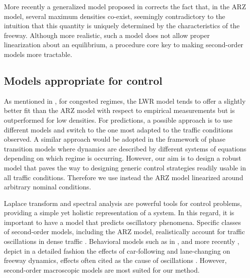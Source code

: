 \documentclass[preprint]{elsarticle}
\begin{document}

More recently a generalized model proposed in \cite{Fan} corrects the fact that, in the ARZ model, several maximum densities co-exist, seemingly contradictory to the intuition that this quantity is uniquely determined by the characteristics of the freeway. Although more realistic, such a model does not allow proper linearization about an equilibrium, a procedure core key to making second-order models more tractable.

\subsection{Models appropriate for control}
As mentioned in \cite{Fan}, for congested regimes, the LWR model tends to offer a slightly better fit than the ARZ model with respect to empirical measurements but is outperformed for low densities. For predictions, a possible approach is to use different models and switch to the one most adapted to the traffic conditions observed. A similar approach would be adopted in the framework of phase transition models \cite{colombo2003hyperbolic, treiber2010three, blandin2011general} where dynamics are described by different systems of equations depending on which regime is occurring. However, our aim is to design a robust model that paves the way to designing generic control strategies readily usable in all traffic conditions. Therefore we use instead the ARZ model linearized around arbitrary nominal conditions. 

Laplace transform and spectral analysis are powerful tools for control problems, providing a simple yet holistic representation of a system. In this regard, it is important to have a model that predicts oscillatory phenomena. Specific classes of second-order models, including the ARZ model, realistically account for traffic oscillations in dense traffic \cite{Greenberg_congestionredux}. Behavioral models such as in \cite{Newell, treiber2000congested}, and more recently \cite{Chen2012, Ge20129}, depict in a detailed fashion the effects of car-following
and lane-changing on freeway dynamics, effects often cited as the cause of oscillations \cite{Mauch02freewaytraffic, lanechangin2005,lanechanging2007}. However, second-order macroscopic models are most suited for our method. 
\end{document}
